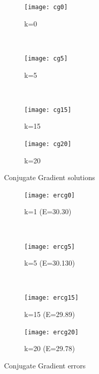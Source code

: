 \documentclass[letterpaper,12pt]{article}
\begin{document}
\begin{enumerate}
\begin{figure}[H]
    \centering
    \begin{subfigure}[b]{0.22\textwidth}
        \texttt{[image: cg0]}
        \caption{k=0}
        \label{fig:gull}
    \end{subfigure}
    ~ %
    \begin{subfigure}[b]{0.22\textwidth}
        \texttt{[image: cg5]}
        \caption{k=5}
        \label{fig:tiger}
    \end{subfigure}
    ~ %
    \begin{subfigure}[b]{0.22\textwidth}
        \texttt{[image: cg15]}
        \caption{k=15}
        \label{fig:mouse}
    \end{subfigure}
     \begin{subfigure}[b]{0.22\textwidth}
        \texttt{[image: cg20]}
        \caption{k=20}
        \label{fig:mouse}
    \end{subfigure}
    \caption{Conjugate Gradient solutions}\label{fig:animals}
\end{figure}
\begin{figure}[H]
    \centering
    \begin{subfigure}[b]{0.22\textwidth}
        \texttt{[image: ercg0]}
        \caption{k=1 (E=30.30)}
        \label{fig:gull}
    \end{subfigure}
    ~ %
    \begin{subfigure}[b]{0.22\textwidth}
        \texttt{[image: ercg5]}
        \caption{k=5 (E=30.130)}
        \label{fig:tiger}
    \end{subfigure}
    ~ %
    \begin{subfigure}[b]{0.22\textwidth}
        \texttt{[image: ercg15]}
        \caption{k=15 (E=29.89)}
        \label{fig:mouse}
    \end{subfigure}
     \begin{subfigure}[b]{0.22\textwidth}
        \texttt{[image: ercg20]}
        \caption{k=20 (E=29.78)}
        \label{fig:mouse}
    \end{subfigure}
    \caption{Conjugate Gradient errors}\label{fig:animals}
\end{figure}




\end{enumerate}
\end{document}
